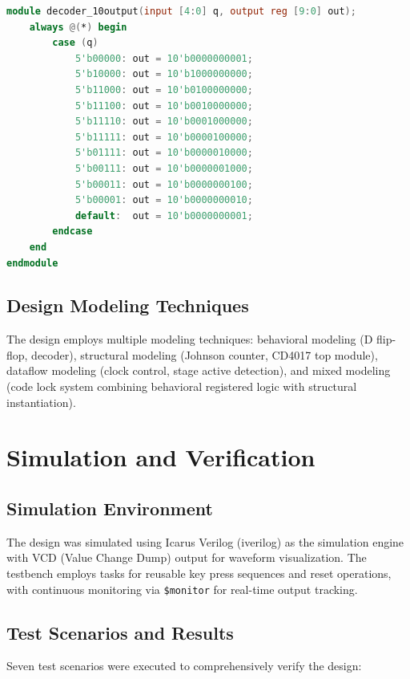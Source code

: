 \documentclass[12pt,a4paper]{report}
\begin{document}
\begin{lstlisting}[language=Verilog, caption=10-Output Decoder]
module decoder_10output(input [4:0] q, output reg [9:0] out);
    always @(*) begin
        case (q)
            5'b00000: out = 10'b0000000001;
            5'b10000: out = 10'b1000000000;
            5'b11000: out = 10'b0100000000;
            5'b11100: out = 10'b0010000000;
            5'b11110: out = 10'b0001000000;
            5'b11111: out = 10'b0000100000;
            5'b01111: out = 10'b0000010000;
            5'b00111: out = 10'b0000001000;
            5'b00011: out = 10'b0000000100;
            5'b00001: out = 10'b0000000010;
            default:  out = 10'b0000000001;
        endcase
    end
endmodule
\end{lstlisting}

\section{Design Modeling Techniques}

The design employs multiple modeling techniques: behavioral modeling (D flip-flop, decoder), structural modeling (Johnson counter, CD4017 top module), dataflow modeling (clock control, stage active detection), and mixed modeling (code lock system combining behavioral registered logic with structural instantiation).

\chapter{Simulation and Verification}

\section{Simulation Environment}

The design was simulated using Icarus Verilog (iverilog) as the simulation engine with VCD (Value Change Dump) output for waveform visualization. The testbench employs tasks for reusable key press sequences and reset operations, with continuous monitoring via \texttt{\$monitor} for real-time output tracking.

\section{Test Scenarios and Results}

Seven test scenarios were executed to comprehensively verify the design:
\end{document}
